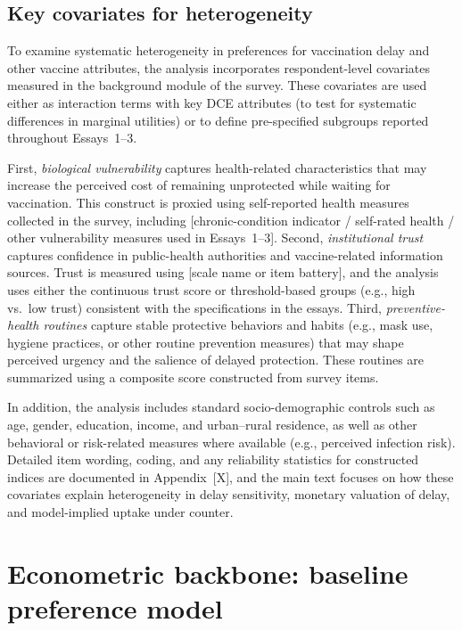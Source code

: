 \documentclass[doublespacing]{utdthesis}
\begin{document}
\subsection{Key covariates for heterogeneity}
\label{subsec:covariates_heterogeneity}

To examine systematic heterogeneity in preferences for vaccination delay and other vaccine attributes, the analysis incorporates respondent-level covariates measured in the background module of the survey. These covariates are used either as interaction terms with key DCE attributes (to test for systematic differences in marginal utilities) or to define pre-specified subgroups reported throughout Essays~1--3.

First, \textit{biological vulnerability} captures health-related characteristics that may increase the perceived cost of remaining unprotected while waiting for vaccination. This construct is proxied using self-reported health measures collected in the survey, including [chronic-condition indicator / self-rated health / other vulnerability measures used in Essays~1--3]. Second, \textit{institutional trust} captures confidence in public-health authorities and vaccine-related information sources. Trust is measured using [scale name or item battery], and the analysis uses either the continuous trust score or threshold-based groups (e.g., high vs.\ low trust) consistent with the specifications in the essays. Third, \textit{preventive-health routines} capture stable protective behaviors and habits (e.g., mask use, hygiene practices, or other routine prevention measures) that may shape perceived urgency and the salience of delayed protection. These routines are summarized using a composite score constructed from survey items.

In addition, the analysis includes standard socio-demographic controls such as age, gender, education, income, and urban--rural residence, as well as other behavioral or risk-related measures where available (e.g., perceived infection risk). Detailed item wording, coding, and any reliability statistics for constructed indices are documented in Appendix~[X], and the main text focuses on how these covariates explain heterogeneity in delay sensitivity, monetary valuation of delay, and model-implied uptake under counter.



\section{Econometric backbone: baseline preference model}
\end{document}
